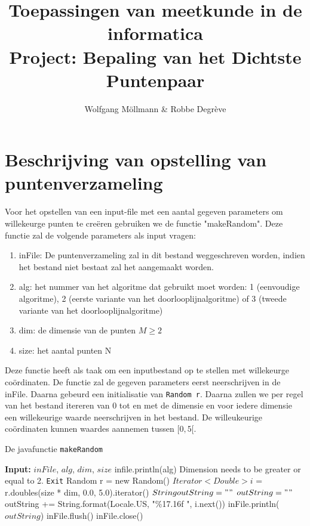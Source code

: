 \documentclass[12pt]{article}
\author{Wolfgang M\"ollmann \& Robbe Degr\`eve}
\title{Toepassingen van meetkunde in de informatica \\ Project: Bepaling van het Dichtste Puntenpaar}
\begin{document}
\maketitle

\newpage

\section{Beschrijving van opstelling van puntenverzameling}
Voor het opstellen van een input-file met een aantal gegeven parameters om willekeurge punten te creëren gebruiken we de functie "makeRandom".
Deze functie zal de volgende parameters als input vragen:
\begin{enumerate}
    \item inFile: De puntenverzameling zal in dit bestand weggeschreven worden, indien het bestand niet bestaat zal het aangemaakt worden.
    \item alg: het nummer van het algoritme dat gebruikt moet worden: 1 (eenvoudige algoritme), 2 (eerste variante van het doorlooplijnalgoritme) of 3 (tweede variante van het doorlooplijnalgoritme)
    \item dim: de dimensie van de punten $M \geq 2$
		\item size: het aantal punten N
\end{enumerate}

Deze functie heeft als taak om een inputbestand op te stellen met willekeurge co\"ordinaten.
De functie zal de gegeven parameters eerst neerschrijven in de inFile.
Daarna gebeurd een initialisatie van \texttt{Random r}.
Daarna zullen we per regel van het bestand itereren van 0 tot en met de dimensie en voor iedere dimensie een willekeurige waarde neerschrijven in het bestand.
De willeukeurige co\"ordinaten kunnen waardes aannemen tussen $[0, 5[$.


\begin{algorithm}
\caption{De javafunctie \texttt{makeRandom}}
\begin{algorithmic}
\STATE \textbf{Input:} $inFile$, $alg$, $dim$, $size$
\STATE infile.println(alg)
	\PRINT Dimension needs to be greater or equal to 2.
	\STATE \texttt{Exit}
\ENDIF
\STATE Random r = new Random()
\STATE $Iterator<Double> i$ = r.doubles(size * dim, 0.0, 5.0).iterator()
\STATE $String outString = ""$
	\STATE $outString = ""$
		\STATE outString += String.format(Locale.US, "\%17.16f ", i.next())
	\ENDFOR
	\STATE inFile.println($outString$)
\ENDWHILE
\STATE inFile.flush()
\STATE inFile.close()
\end{algorithmic}
\end{algorithm}
\end{document}
